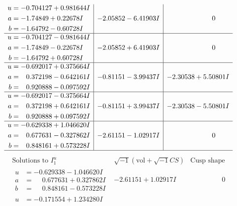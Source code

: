 \documentclass[1p]{elsarticle_modified}
\theoremstyle{definition}
\newcommand{\I}{\sqrt{-1}}
\begin{document}
$$\begin{array}{c|c|c}
\begin{aligned}
u &= -0.704127 + 0.981644 I \\
a &= -1.74849 + 0.22678 I \\
b &= -1.64792 - 0.60728 I\end{aligned}
 & -2.05852 - 6.41903 I & \phantom{-0.000000 } 0 \\ \hline\begin{aligned}
u &= -0.704127 - 0.981644 I \\
a &= -1.74849 - 0.22678 I \\
b &= -1.64792 + 0.60728 I\end{aligned}
 & -2.05852 + 6.41903 I & \phantom{-0.000000 } 0 \\ \hline\begin{aligned}
u &= -0.692017 + 0.375664 I \\
a &= \phantom{-}0.372198 - 0.642161 I \\
b &= \phantom{-}0.920888 - 0.097592 I\end{aligned}
 & -0.81151 - 3.99437 I & -2.30538 + 5.50801 I \\ \hline\begin{aligned}
u &= -0.692017 - 0.375664 I \\
a &= \phantom{-}0.372198 + 0.642161 I \\
b &= \phantom{-}0.920888 + 0.097592 I\end{aligned}
 & -0.81151 + 3.99437 I & -2.30538 - 5.50801 I \\ \hline\begin{aligned}
u &= -0.629338 + 1.046620 I \\
a &= \phantom{-}0.677631 - 0.327862 I \\
b &= \phantom{-}0.848161 + 0.573228 I\end{aligned}
 & -2.61151 - 1.02917 I & \phantom{-0.000000 } 0\\
 \hline 
 \end{array}$$\newpage$$\begin{array}{c|c|c}  
\text{Solutions to }I^u_{1}& \I (\text{vol} + \sqrt{-1}CS) & \text{Cusp shape}\\
 \hline 
\begin{aligned}
u &= -0.629338 - 1.046620 I \\
a &= \phantom{-}0.677631 + 0.327862 I \\
b &= \phantom{-}0.848161 - 0.573228 I\end{aligned}
 & -2.61151 + 1.02917 I & \phantom{-0.000000 } 0 \\ \hline\begin{aligned}
u &= -0.171554 + 1.234280 I \\

\end{aligned}
\end{array}$$
\end{document}
